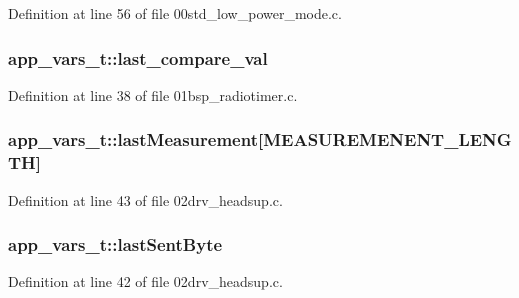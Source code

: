 Definition at line 56 of file 00std\+\_\+low\+\_\+power\+\_\+mode.\+c.

\subsubsection[{\texorpdfstring{last\+\_\+compare\+\_\+val}{last_compare_val}}]{ app\+\_\+vars\+\_\+t\+::last\+\_\+compare\+\_\+val}\hypertarget{structapp__vars__t_ad7adbb5401e82444f954f812f699787d}{}\label{structapp__vars__t_ad7adbb5401e82444f954f812f699787d}


Definition at line 38 of file 01bsp\+\_\+radiotimer.\+c.

\subsubsection[{\texorpdfstring{last\+Measurement}{lastMeasurement}}]{ app\+\_\+vars\+\_\+t\+::last\+Measurement\mbox{[}{\bf M\+E\+A\+S\+U\+R\+E\+M\+E\+N\+E\+N\+T\+\_\+\+L\+E\+N\+G\+TH}\mbox{]}}\hypertarget{structapp__vars__t_a13b91ef4261c73df72577665d2dbd074}{}\label{structapp__vars__t_a13b91ef4261c73df72577665d2dbd074}


Definition at line 43 of file 02drv\+\_\+headsup.\+c.

\subsubsection[{\texorpdfstring{last\+Sent\+Byte}{lastSentByte}}]{ app\+\_\+vars\+\_\+t\+::last\+Sent\+Byte}\hypertarget{structapp__vars__t_a397235a8b7dc41ab245e3a8d80137654}{}\label{structapp__vars__t_a397235a8b7dc41ab245e3a8d80137654}


Definition at line 42 of file 02drv\+\_\+headsup.\+c.

